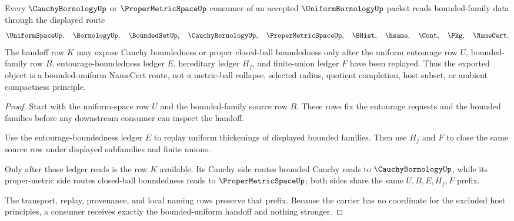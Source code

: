\begin{theorem}
\label{thm:uniform-bornology-uniform-space-handoff}
Every $\CauchyBornologyUp$ or $\ProperMetricSpaceUp$ consumer of an accepted $\UniformBornologyUp$ packet reads bounded-family data through the displayed route
$$
\UniformSpaceUp,\quad \BornologyUp,\quad \BoundedSetUp,\quad \CauchyBornologyUp,\quad \ProperMetricSpaceUp,\quad \BHist,\quad \hsame,\quad \Cont,\quad \Pkg,\quad \NameCert .
$$
The handoff row $K$ may expose Cauchy boundedness or proper closed-ball boundedness only after the uniform entourage row $U$, bounded-family row $B$, entourage-boundedness ledger $E$, hereditary ledger $H_f$, and finite-union ledger $F$ have been replayed. Thus the exported object is a bounded-uniform NameCert route, not a metric-ball collapse, selected radius, quotient completion, host subset, or ambient compactness principle.
\end{theorem}
\begin{proof}
Start with the uniform-space row $U$ and the bounded-family source row $B$. These rows fix the entourage requests and the bounded families before any downstream consumer can inspect the handoff.

Use the entourage-boundedness ledger $E$ to replay uniform thickenings of displayed bounded families. Then use $H_f$ and $F$ to close the same source row under displayed subfamilies and finite unions.

Only after those ledger reads is the row $K$ available. Its Cauchy side routes bounded Cauchy reads to $\CauchyBornologyUp$, while its proper-metric side routes closed-ball boundedness reads to $\ProperMetricSpaceUp$; both sides share the same $U,B,E,H_f,F$ prefix.

The transport, replay, provenance, and local naming rows preserve that prefix. Because the carrier has no coordinate for the excluded host principles, a consumer receives exactly the bounded-uniform handoff and nothing stronger.
\end{proof}


